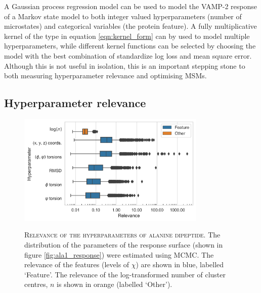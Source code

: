 A Gaussian process regression model can be used to model the VAMP-2 response of a Markov state model to both integer valued hyperparameters (number of microstates) and categorical variables (the protein feature). A fully multiplicative kernel of the type in equation \ref{eqn:kernel_form} can by used to model multiple  hyperparameters, while different kernel functions can be selected by choosing the model with the best combination of standardize log loss and mean square error. Although this is not useful in isolation, this is an important stepping stone to both measuring hyperparameter relevance and optimising MSMs. 

 
\subsection{Hyperparameter relevance}\label{subsubsec:ala_relevance}

\begin{figure}
    \centering
    \caption[Relevance of the hyperparameters of alanine dipeptide]{\textsc{Relevance of the hyperparameters of alanine dipeptide}. The distribution of the parameters of the response surface (shown in figure \ref{fig:ala1_response}) were estimated using MCMC. The relevance of the features (levels of $\chi$) are shown in blue, labelled `Feature'. The relevance of the log-transformed number of cluster centres, $n$ is shown in orange (labelled `Other').}
    \includegraphics[width=0.8\textwidth]{chapters/msm_optimization/figures/ala1_relevance.png}
    \label{fig:ala1_relevance}
\end{figure}


